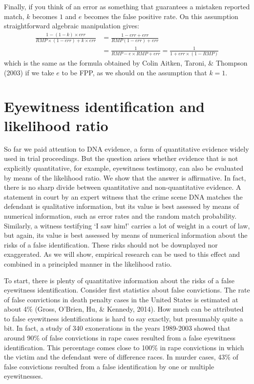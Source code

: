 \documentclass[
  10pt,
  dvipsnames,enabledeprecatedfontcommands]{scrartcl}
\begin{document}

Finally, if you think of an error as something that guarantees a
mistaken reported match, \(k\) becomes \(1\) and \(e\) becomes the false
positive rate. On this assumption straightforward algebraic manipulation
gives: \begin{align*}
 \frac{1 - (1-k)\times err}{RMP\times (1-err)+k\times err} & = \frac{1-err+err}{RMP(1-err)+err}\\
 & = \frac{1}{RMP - e\times RMP + err} = \frac{1}{1 + err\times(1-RMP)}
\end{align*} \noindent which is the same as the formula obtained by
Colin Aitken, Taroni, \& Thompson (2003) if we take \(e\) to be FPP, as
we should on the assumption that \(k=1\).

\hypertarget{eyewitness-identification-and-likelihood-ratio}{%
\section{\texorpdfstring{Eyewitness identification and likelihood ratio
\label{sec:eyewitness}}{Eyewitness identification and likelihood ratio }}\label{eyewitness-identification-and-likelihood-ratio}}

So far we paid attention to DNA evidence, a form of quantitative
evidence widely used in trial proceedings. But the question arises
whether evidence that is not explicitly quantitative, for example,
eyewitness testimony, can also be evaluated by means of the likelihood
ratio. We show that the answer is affirmative. In fact, there is no
sharp divide between quantitative and non-quantitative evidence. A
statement in court by an expert witness that the crime scene DNA matches
the defendant is qualitative information, but its value is best assessed
by means of numerical information, such as error rates and the random
match probability. Similarly, a witness testifying `I saw him!' carries
a lot of weight in a court of law, but again, its value is best assessed
by means of numerical information about the risks of a false
identification. These risks should not be downplayed nor exaggerated. As
we will show, empirical research can be used to this effect and combined
in a principled manner in the likelihood ratio.

To start, there is plenty of quantitative information about the risks of
a false eyewitness identification. Consider first statistics about false
convictions. The rate of false convictions in death penalty cases in the
United States is estimated at about 4\% (Gross, O'Brien, Hu, \& Kennedy,
2014). How much can be attributed to false eyewitness identifications is
hard to say exactly, but presumably quite a bit. In fact, a study of 340
exonerations in the years 1989-2003 showed that around 90\% of false
convictions in rape cases resulted from a false eyewitness
identification. This percentage comes close to 100\% in rape convictions
in which the victim and the defendant were of difference races. In
murder cases, 43\% of false convictions resulted from a false
identification by one or multiple eyewitnesses. 
\end{document}
